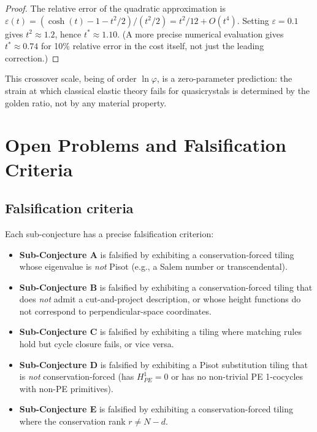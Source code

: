 \documentclass[12pt]{article}
\theoremstyle{definition}
\theoremstyle{remark}
\begin{document}
\begin{proof}
The relative error of the quadratic approximation is $\varepsilon(t) = (\cosh(t) - 1 - t^2/2)/(t^2/2) = t^2/12 + O(t^4)$. Setting $\varepsilon = 0.1$ gives $t^2 \approx 1.2$, hence $t^* \approx 1.10$. (A more precise numerical evaluation gives $t^* \approx 0.74$ for 10\% relative error in the cost itself, not just the leading correction.)
\end{proof}

This crossover scale, being of order $\ln \varphi$, is a zero-parameter prediction: the strain at which classical elastic theory fails for quasicrystals is determined by the golden ratio, not by any material property.


\section{Open Problems and Falsification Criteria}
\label{sec:open}

\subsection{Falsification criteria}

Each sub-conjecture has a precise falsification criterion:

\begin{itemize}
\item \textbf{Sub-Conjecture A} is falsified by exhibiting a conservation-forced tiling whose eigenvalue is \emph{not} Pisot (e.g., a Salem number or transcendental).

\item \textbf{Sub-Conjecture B} is falsified by exhibiting a conservation-forced tiling that does \emph{not} admit a cut-and-project description, or whose height functions do not correspond to perpendicular-space coordinates.

\item \textbf{Sub-Conjecture C} is falsified by exhibiting a tiling where matching rules hold but cycle closure fails, or vice versa.

\item \textbf{Sub-Conjecture D} is falsified by exhibiting a Pisot substitution tiling that is \emph{not} conservation-forced (has $H^1_{PE} = 0$ or has no non-trivial PE 1-cocycles with non-PE primitives).

\item \textbf{Sub-Conjecture E} is falsified by exhibiting a conservation-forced tiling where the conservation rank $r \neq N - d$.
\end{itemize}
\end{document}
